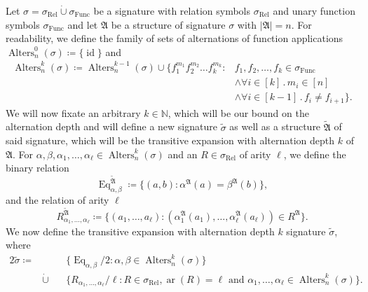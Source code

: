 \begin{definition}
	Let $\sigma= \sigma_{\operatorname{Rel}} \operatorname{\dot{\cup}} \sigma_{\operatorname{Func}}$ be a signature with relation symbols $\sigma_{\operatorname{Rel}}$ and unary function symbols $\sigma_{\operatorname{Func}}$ and let $\mathfrak A$ be a structure of signature $\sigma$ with $\vert \mathfrak A \vert=n$.
	For readability, we define the family of sets of alternations of function applications $\operatorname{Alters}_n^0(\sigma)\coloneqq\{\operatorname{id}\}$ and
	\begin{align*}
		\operatorname{Alters}^k_{n}(\sigma)\coloneqq \operatorname{Alters}^{k-1}_{n}(\sigma)\cup\{f_1^{m_1}f_2^{m_2}\dots f_k^{m_k} : & f_1,f_2,\dots, f_k\in \sigma_{\operatorname{Func}} \\ 
		& \land \forall i\in[k]\operatorname{.} m_i\in[n] \\ 
		& \land \forall i\in[k-1] \operatorname{.} f_{i} \neq f_{i+1}\}.
	\end{align*}
	We will now fixate an arbitrary $k\in\mathbb N$, which will be our bound on the alternation depth and will define a new signature $\widetilde{\sigma}$ as well as a structure $\widetilde{\mathfrak A}$ of said signature, which will be the transitive expansion with alternation depth $k$ of $\mathfrak{A}$.
	For $\alpha,\beta,\alpha_1,\dots,\alpha_\ell\in \operatorname{Alters}^k_n(\sigma)$ and an $R\in \sigma_{\operatorname{Rel}}$ of arity $\ell$, we define the binary relation
	$$\operatorname{Eq}_{\alpha,\beta}^{\widetilde{\mathfrak A}}\coloneqq \{(a,b) : \alpha^{\mathfrak A}(a)=\beta^{\mathfrak A}(b)\},$$
	and the relation of arity $\ell$
	$$R_{\alpha_1,\dots,\alpha_\ell}^{\widetilde{\mathfrak A}} \coloneqq \{(a_1,\dots,a_\ell) : (\alpha_1^{\mathfrak A}(a_1),\dots,\alpha_\ell^{\mathfrak A}(a_\ell))\in R^{\mathfrak A}\}.$$
	We now define the transitive expansion with alternation depth $k$ signature $\widetilde{\sigma}$, where 
	\begin{alignat*}{2}
		\widetilde{\sigma}\coloneqq & &&\{\operatorname{Eq}_{\alpha,\beta}/2: \alpha,\beta\in\operatorname{Alters}^k_n(\sigma)\} \\
		&  \operatorname{\dot{\cup}} \, && \{R_{\alpha_1,\dots,\alpha_\ell}/\ell : R\in \sigma_{\operatorname{Rel}},\operatorname{ar}(R)=\ell \text{ and } \alpha_1,\dots,\alpha_\ell\in \operatorname{Alters}^k_n(\sigma)\}.
	\end{alignat*}
\end{definition}

